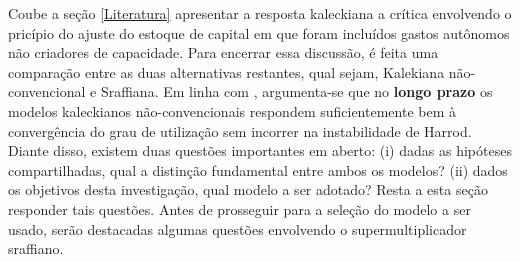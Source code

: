 Coube a seção \ref{Literatura} apresentar a resposta kaleckiana a crítica envolvendo o pricípio do ajuste do estoque de capital em que foram incluídos gastos autônomos não criadores de capacidade. Para encerrar essa discussão, é feita uma comparação entre as duas alternativas restantes, qual sejam, Kalekiana não-convencional e Sraffiana. Em linha com \textcite{fagundes_role_2017}, argumenta-se que no \textbf{longo prazo} os modelos kaleckianos não-convencionais respondem suficientemente bem à convergência do grau de utilização sem incorrer na instabilidade de Harrod. Diante disso, existem duas questões importantes em aberto: (i) dadas as hipóteses compartilhadas, qual a distinção fundamental entre ambos os modelos? (ii) dados os objetivos desta investigação, qual modelo a ser adotado? Resta a esta seção responder tais questões. Antes de prosseguir para a seleção do modelo a ser usado, serão destacadas algumas questões envolvendo o supermultiplicador sraffiano. 

